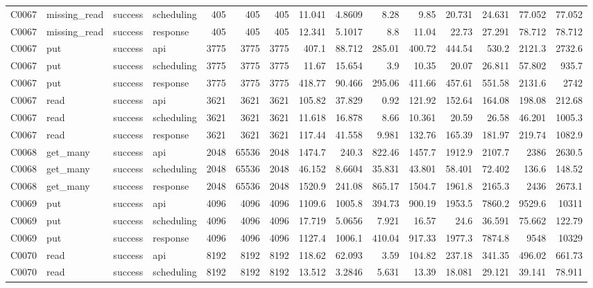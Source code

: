 \begin{landscape}
\begin{longtable}{llllrrrrrrrrrrr}
C0067 & missing\_\allowbreak{}read & success & scheduling & 405 & 405 & 405 & 11.041 & 4.8609 & 8.28 & 9.85 & 20.731 & 24.631 & 77.052 & 77.052\\
C0067 & missing\_\allowbreak{}read & success & response & 405 & 405 & 405 & 12.341 & 5.1017 & 8.8 & 11.04 & 22.73 & 27.291 & 78.712 & 78.712\\
C0067 & put & success & api & 3775 & 3775 & 3775 & 407.1 & 88.712 & 285.01 & 400.72 & 444.54 & 530.2 & 2121.3 & 2732.6\\
C0067 & put & success & scheduling & 3775 & 3775 & 3775 & 11.67 & 15.654 & 3.9 & 10.35 & 20.07 & 26.811 & 57.802 & 935.7\\
C0067 & put & success & response & 3775 & 3775 & 3775 & 418.77 & 90.466 & 295.06 & 411.66 & 457.61 & 551.58 & 2131.6 & 2742\\
C0067 & read & success & api & 3621 & 3621 & 3621 & 105.82 & 37.829 & 0.92 & 121.92 & 152.64 & 164.08 & 198.08 & 212.68\\
C0067 & read & success & scheduling & 3621 & 3621 & 3621 & 11.618 & 16.878 & 8.66 & 10.361 & 20.59 & 26.58 & 46.201 & 1005.3\\
C0067 & read & success & response & 3621 & 3621 & 3621 & 117.44 & 41.558 & 9.981 & 132.76 & 165.39 & 181.97 & 219.74 & 1082.9\\
C0068 & get\_\allowbreak{}many & success & api & 2048 & 65536 & 2048 & 1474.7 & 240.3 & 822.46 & 1457.7 & 1912.9 & 2107.7 & 2386 & 2630.5\\
C0068 & get\_\allowbreak{}many & success & scheduling & 2048 & 65536 & 2048 & 46.152 & 8.6604 & 35.831 & 43.801 & 58.401 & 72.402 & 136.6 & 148.52\\
C0068 & get\_\allowbreak{}many & success & response & 2048 & 65536 & 2048 & 1520.9 & 241.08 & 865.17 & 1504.7 & 1961.8 & 2165.3 & 2436 & 2673.1\\
C0069 & put & success & api & 4096 & 4096 & 4096 & 1109.6 & 1005.8 & 394.73 & 900.19 & 1953.5 & 7860.2 & 9529.6 & 10311\\
C0069 & put & success & scheduling & 4096 & 4096 & 4096 & 17.719 & 5.0656 & 7.921 & 16.57 & 24.6 & 36.591 & 75.662 & 122.79\\
C0069 & put & success & response & 4096 & 4096 & 4096 & 1127.4 & 1006.1 & 410.04 & 917.33 & 1977.3 & 7874.8 & 9548 & 10329\\
C0070 & read & success & api & 8192 & 8192 & 8192 & 118.62 & 62.093 & 3.59 & 104.82 & 237.18 & 341.35 & 496.02 & 661.73\\
C0070 & read & success & scheduling & 8192 & 8192 & 8192 & 13.512 & 3.2846 & 5.631 & 13.39 & 18.081 & 29.121 & 39.141 & 78.911\\

\end{longtable}
\end{landscape}
